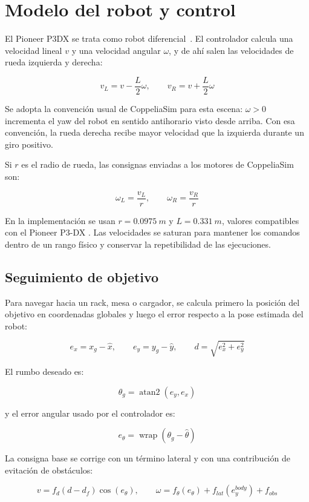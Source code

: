 \chapter{Modelo del robot y control}
\label{ch:modelo-robot}

El Pioneer P3DX se trata como robot diferencial~\cite{tzafestas2014}. El controlador calcula una
velocidad lineal \(v\) y una velocidad angular \(\omega\), y de ahí salen las
velocidades de rueda izquierda y derecha:

\[
v_L = v - \frac{L}{2}\omega,\qquad
v_R = v + \frac{L}{2}\omega
\]

Se adopta la convención usual de CoppeliaSim para esta escena: \(\omega>0\)
incrementa el yaw del robot en sentido antihorario visto desde arriba. Con esa
convención, la rueda derecha recibe mayor velocidad que la izquierda durante un
giro positivo.

Si \(r\) es el radio de rueda, las consignas enviadas a los motores de
CoppeliaSim son:

\[
\omega_L = \frac{v_L}{r},\qquad
\omega_R = \frac{v_R}{r}
\]

En la implementación se usan \(r=\SI{0.0975}{m}\) y \(L=\SI{0.331}{m}\), valores
compatibles con el Pioneer P3-DX \cite{mobilerobotsPioneer3}. Las velocidades
se saturan para mantener los comandos dentro de un rango físico y conservar la
repetibilidad de las ejecuciones.

\section{Seguimiento de objetivo}

Para navegar hacia un rack, mesa o cargador, se calcula primero la posición del
objetivo en coordenadas globales y luego el error respecto a la pose estimada
del robot:

\[
e_x = x_g-\hat{x},\qquad e_y = y_g-\hat{y},\qquad
d = \sqrt{e_x^2+e_y^2}
\]

El rumbo deseado es:

\[
\theta_g = \operatorname{atan2}(e_y,e_x)
\]

y el error angular usado por el controlador es:

\[
e_\theta = \operatorname{wrap}(\theta_g-\hat{\theta})
\]

La consigna base se corrige con un término lateral y con una contribución de
evitación de obstáculos:

\[
v = f_d(d-d_f)\cos(e_\theta),\qquad
\omega = f_\theta(e_\theta) + f_{lat}(e_y^{body}) + f_{obs}
\]

